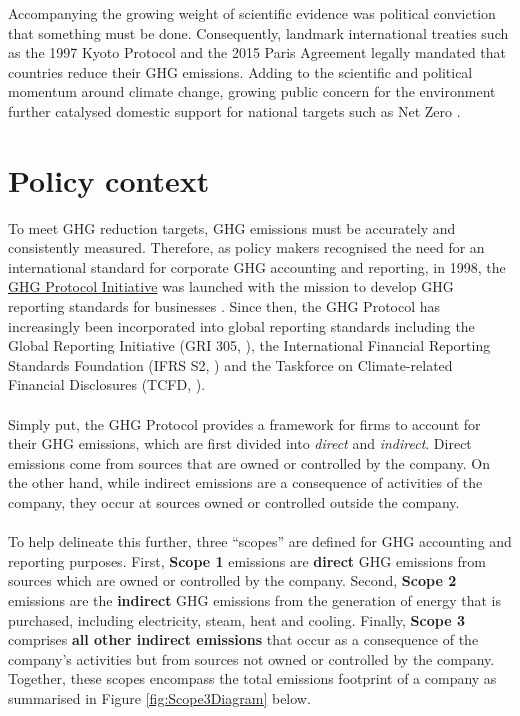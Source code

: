 \documentclass[12pt,twoside]{report}
\begin{document}
Accompanying the growing weight of scientific evidence was political conviction that something must be done. Consequently, landmark international treaties such as the 1997 Kyoto Protocol \cite{UN1997} and the 2015 Paris Agreement \cite{UNFCCC2020} legally mandated that countries reduce their GHG emissions. Adding to the scientific and political momentum around climate change, growing public concern for the environment further catalysed domestic support for national targets such as Net Zero \cite{Poortinga2023}. 

\section{Policy context}\label{sec:PolicyContext}
To meet GHG reduction targets, GHG emissions must be accurately and consistently measured. Therefore, as policy makers recognised the need for an international standard for corporate GHG accounting and reporting, in 1998, the \href{https://ghgprotocol.org/about-us}{GHG Protocol Initiative} was launched with the mission to develop GHG reporting standards for businesses \cite{ghgprotocol2004}. Since then, the GHG Protocol has increasingly been incorporated into global reporting standards including the Global Reporting Initiative (GRI 305, \cite{gri2016}), the International Financial Reporting Standards Foundation (IFRS S2, \cite{ifrs2023}) and the Taskforce on Climate-related Financial Disclosures (TCFD, \cite{tcfd2021}).
\\ \\
Simply put, the GHG Protocol provides a framework for firms to account for their GHG emissions, which are first divided into \textit{direct} and \textit{indirect}. Direct emissions come from sources that are owned or controlled by the company. On the other hand, while indirect emissions are a consequence of activities of the company, they occur at sources owned or controlled outside the company. 
\\ \\
To help delineate this further, three ``scopes'' are defined for GHG accounting and reporting purposes. First,  \textbf{Scope 1} emissions are \textbf{direct} GHG emissions from sources which are owned or controlled by the company. Second, \textbf{Scope 2} emissions are the \textbf{indirect} GHG emissions from the generation of energy that is purchased, including electricity, steam, heat and cooling. Finally, \textbf{Scope 3} comprises \textbf{all other indirect emissions} that occur as a consequence of the company's activities but from sources not owned or controlled by the company. Together, these scopes encompass the total emissions footprint of a company as summarised in Figure \ref{fig:Scope3Diagram} below.
\end{document}
